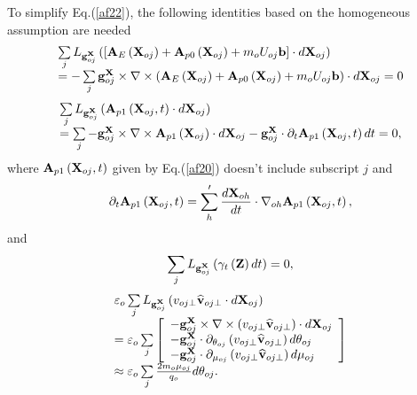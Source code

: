 \documentclass[12pt]{iopart}
\begin{document}
To simplify Eq.(\ref{af22}), the following identities based on the homogeneous assumption are needed
\begin{equation}\label{af25}
\begin{array}{l}
\sum\limits_j {{L_{{\bf{g}}_{oj}^{\bf{X}}}}\left( {\left[ {{{\bf{A}}_E}\left( {{{\bf{X}}_{oj}}} \right) + {{\bf{A}}_{p0}}\left( {{{\bf{X}}_{oj}}} \right) + {m_o}{U_{oj}}{\bf{b}}} \right]\cdot d{{\bf{X}}_{oj}}} \right)} \\
 =  - \sum\limits_j {{\bf{g}}_{oj}^{\bf{X}} \times \nabla  \times \left( {{{\bf{A}}_E}\left( {{{\bf{X}}_{oj}}} \right) + {{\bf{A}}_{p0}}\left( {{{\bf{X}}_{oj}}} \right) + {m_o}{U_{oj}}{\bf{b}}} \right)\cdot d{{\bf{X}}_{oj}}}  = 0
\end{array}
\end{equation}
\begin{equation}\label{af26}
\begin{array}{l}
\sum\limits_j {{L_{{\bf{g}}_{oj}^{\bf{X}}}}\left( {{{\bf{A}}_{p1}}\left( {{{\bf{X}}_{oj}},t} \right)\cdot d{{\bf{X}}_{oj}}} \right)} \\
 = \sum\limits_j { - {\bf{g}}_{oj}^{\bf{X}} \times \nabla  \times {{\bf{A}}_{p1}}\left( {{{\bf{X}}_{oj}}} \right)\cdot d{{\bf{X}}_{oj}} - {\bf{g}}_{oj}^{\bf{X}}\cdot{\partial _t}{{\bf{A}}_{p1}}\left( {{{\bf{X}}_{oj}},t} \right)dt}  = 0,
\end{array}
\end{equation}
where ${{\bf{A}}_{p1}}\left( {{{\bf{X}}_{oj}},t} \right)$ given by Eq.(\ref{af20}) doesn't include subscript $j$ and
\begin{equation}\label{af27}
{\partial _t}{{\bf{A}}_{p1}}\left( {{{\bf{X}}_{oj}},t} \right) = \sum'\limits_h {\frac{{d{{\bf{X}}_{oh}}}}{{dt}}} \cdot{\nabla _{oh}}{{\bf{A}}_{p1}}\left( {{{\bf{X}}_{oj}},t} \right),
\end{equation}
and
\begin{equation}\label{af28}
\sum\limits_j {{L_{{\bf{g}}_{oj}^{\bf{X}}}}\left( {{\gamma _t}\left( {\bf{Z}} \right)dt} \right) = 0},
\end{equation}
\begin{equation}\label{af29}
\begin{array}{*{20}{l}}
{{\varepsilon _o}\sum\limits_j {{L_{{\bf{g}}_{oj}^{\bf{X}}}}\left( {{v_{oj \bot }}{{\widehat {\bf{v}}}_{oj \bot }}\cdot d{{\bf{X}}_{oj}}} \right)} }\\
{ = {\varepsilon _o}\sum\limits_j {\left[ {\begin{array}{*{20}{l}}
{ - {\bf{g}}_{oj}^{\bf{X}} \times \nabla  \times \left( {{v_{oj \bot }}{{\widehat {\bf{v}}}_{oj \bot }}} \right)\cdot d{{\bf{X}}_{oj}}}\\
{ - {\bf{g}}_{oj}^{\bf{X}}\cdot{\partial _{{\theta _{oj}}}}\left( {{v_{oj \bot }}{{\widehat {\bf{v}}}_{oj \bot }}} \right)d{\theta _{oj}}}\\
{ - {\bf{g}}_{oj}^{\bf{X}}\cdot{\partial _{{\mu _{oj}}}}\left( {{v_{oj \bot }}{{\widehat {\bf{v}}}_{oj \bot }}} \right)d{\mu _{oj}}}
\end{array}} \right]} }\\
{ \approx {\varepsilon _o}\sum\limits_j {\frac{{2{m_o}{\mu _{oj}}}}{{{q_o}}}d{\theta _{oj}}} .}
\end{array}
\end{equation}
\end{document}
